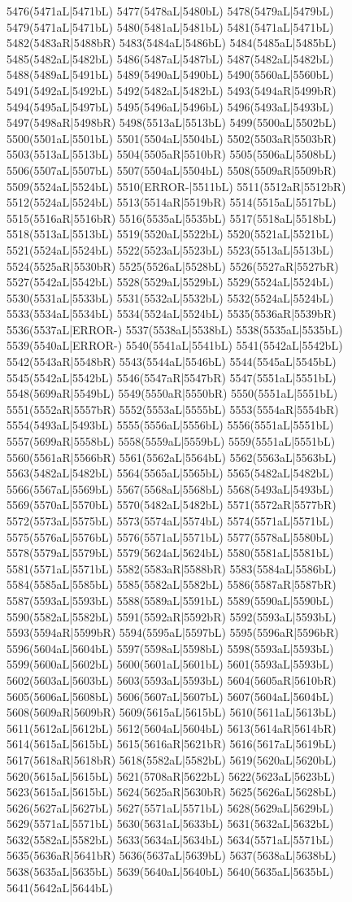 5476(5471aL|5471bL) 5477(5478aL|5480bL) 5478(5479aL|5479bL) 5479(5471aL|5471bL) 5480(5481aL|5481bL) 5481(5471aL|5471bL) 5482(5483aR|5488bR) 5483(5484aL|5486bL) 5484(5485aL|5485bL) 5485(5482aL|5482bL) 5486(5487aL|5487bL) 5487(5482aL|5482bL) 5488(5489aL|5491bL) 5489(5490aL|5490bL) 5490(5560aL|5560bL) 5491(5492aL|5492bL) 5492(5482aL|5482bL) 5493(5494aR|5499bR) 5494(5495aL|5497bL) 5495(5496aL|5496bL) 5496(5493aL|5493bL) 5497(5498aR|5498bR) 5498(5513aL|5513bL) 5499(5500aL|5502bL) 5500(5501aL|5501bL) 5501(5504aL|5504bL) 5502(5503aR|5503bR) 5503(5513aL|5513bL) 5504(5505aR|5510bR) 5505(5506aL|5508bL) 5506(5507aL|5507bL) 5507(5504aL|5504bL) 5508(5509aR|5509bR) 5509(5524aL|5524bL) 5510(ERROR-|5511bL) 5511(5512aR|5512bR) 5512(5524aL|5524bL) 5513(5514aR|5519bR) 5514(5515aL|5517bL) 5515(5516aR|5516bR) 5516(5535aL|5535bL) 5517(5518aL|5518bL) 5518(5513aL|5513bL) 5519(5520aL|5522bL) 5520(5521aL|5521bL) 5521(5524aL|5524bL) 5522(5523aL|5523bL) 5523(5513aL|5513bL) 5524(5525aR|5530bR) 5525(5526aL|5528bL) 5526(5527aR|5527bR) 5527(5542aL|5542bL) 5528(5529aL|5529bL) 5529(5524aL|5524bL) 5530(5531aL|5533bL) 5531(5532aL|5532bL) 5532(5524aL|5524bL) 5533(5534aL|5534bL) 5534(5524aL|5524bL) 5535(5536aR|5539bR) 5536(5537aL|ERROR-) 5537(5538aL|5538bL) 5538(5535aL|5535bL) 5539(5540aL|ERROR-) 5540(5541aL|5541bL) 5541(5542aL|5542bL) 5542(5543aR|5548bR) 5543(5544aL|5546bL) 5544(5545aL|5545bL) 5545(5542aL|5542bL) 5546(5547aR|5547bR) 5547(5551aL|5551bL) 5548(5699aR|5549bL) 5549(5550aR|5550bR) 5550(5551aL|5551bL) 5551(5552aR|5557bR) 5552(5553aL|5555bL) 5553(5554aR|5554bR) 5554(5493aL|5493bL) 5555(5556aL|5556bL) 5556(5551aL|5551bL) 5557(5699aR|5558bL) 5558(5559aL|5559bL) 5559(5551aL|5551bL) 5560(5561aR|5566bR) 5561(5562aL|5564bL) 5562(5563aL|5563bL) 5563(5482aL|5482bL) 5564(5565aL|5565bL) 5565(5482aL|5482bL) 5566(5567aL|5569bL) 5567(5568aL|5568bL) 5568(5493aL|5493bL) 5569(5570aL|5570bL) 5570(5482aL|5482bL) 5571(5572aR|5577bR) 5572(5573aL|5575bL) 5573(5574aL|5574bL) 5574(5571aL|5571bL) 5575(5576aL|5576bL) 5576(5571aL|5571bL) 5577(5578aL|5580bL) 5578(5579aL|5579bL) 5579(5624aL|5624bL) 5580(5581aL|5581bL) 5581(5571aL|5571bL) 5582(5583aR|5588bR) 5583(5584aL|5586bL) 5584(5585aL|5585bL) 5585(5582aL|5582bL) 5586(5587aR|5587bR) 5587(5593aL|5593bL) 5588(5589aL|5591bL) 5589(5590aL|5590bL) 5590(5582aL|5582bL) 5591(5592aR|5592bR) 5592(5593aL|5593bL) 5593(5594aR|5599bR) 5594(5595aL|5597bL) 5595(5596aR|5596bR) 5596(5604aL|5604bL) 5597(5598aL|5598bL) 5598(5593aL|5593bL) 5599(5600aL|5602bL) 5600(5601aL|5601bL) 5601(5593aL|5593bL) 5602(5603aL|5603bL) 5603(5593aL|5593bL) 5604(5605aR|5610bR) 5605(5606aL|5608bL) 5606(5607aL|5607bL) 5607(5604aL|5604bL) 5608(5609aR|5609bR) 5609(5615aL|5615bL) 5610(5611aL|5613bL) 5611(5612aL|5612bL) 5612(5604aL|5604bL) 5613(5614aR|5614bR) 5614(5615aL|5615bL) 5615(5616aR|5621bR) 5616(5617aL|5619bL) 5617(5618aR|5618bR) 5618(5582aL|5582bL) 5619(5620aL|5620bL) 5620(5615aL|5615bL) 5621(5708aR|5622bL) 5622(5623aL|5623bL) 5623(5615aL|5615bL) 5624(5625aR|5630bR) 5625(5626aL|5628bL) 5626(5627aL|5627bL) 5627(5571aL|5571bL) 5628(5629aL|5629bL) 5629(5571aL|5571bL) 5630(5631aL|5633bL) 5631(5632aL|5632bL) 5632(5582aL|5582bL) 5633(5634aL|5634bL) 5634(5571aL|5571bL) 5635(5636aR|5641bR) 5636(5637aL|5639bL) 5637(5638aL|5638bL) 5638(5635aL|5635bL) 5639(5640aL|5640bL) 5640(5635aL|5635bL) 5641(5642aL|5644bL) 